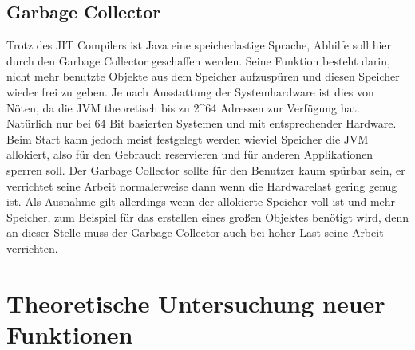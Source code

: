 \section{Garbage Collector}
\label{sec:GC}
Trotz des JIT Compilers ist Java eine speicherlastige Sprache, Abhilfe soll hier
durch den Garbage Collector geschaffen werden. Seine Funktion besteht darin,
nicht mehr benutzte Objekte aus dem Speicher aufzuspüren und diesen Speicher
wieder frei zu geben. Je nach Ausstattung der Systemhardware ist dies von Nöten,
da die JVM theoretisch bis zu 2\textasciicircum64 Adressen zur Verfügung hat.
Natürlich nur bei 64 Bit basierten Systemen und mit entsprechender Hardware. Beim Start kann 
jedoch meist festgelegt werden wieviel Speicher die JVM allokiert, also
für den Gebrauch reservieren und für anderen Applikationen sperren soll. Der
Garbage Collector sollte für den Benutzer kaum spürbar sein, er verrichtet seine Arbeit
normalerweise dann wenn die Hardwarelast gering genug ist. Als Ausnahme gilt
allerdings wenn der allokierte Speicher voll ist und mehr Speicher, zum Beispiel für das
erstellen eines großen Objektes benötigt wird, denn an dieser Stelle muss der
Garbage Collector auch bei hoher Last seine Arbeit verrichten.

\chapter{Theoretische Untersuchung neuer Funktionen}
\label{sec:Theorie}

